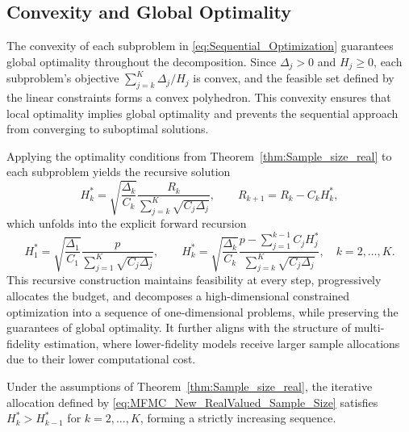 \subsection{Convexity and Global Optimality}
The convexity of each subproblem in \eqref{eq:Sequential_Optimization} guarantees global optimality throughout the decomposition. Since $\Delta_j > 0$ and $H_j \ge 0$, each subproblem's objective $\sum_{j=k}^K \Delta_j/H_j$ is convex, and the feasible set defined by the linear constraints forms a convex polyhedron. This convexity ensures that local optimality implies global optimality and prevents the sequential approach from converging to suboptimal solutions. 

Applying the optimality conditions from Theorem~\ref{thm:Sample_size_real} to each subproblem yields the recursive solution
%
\begin{equation*}
    H_k^* = \sqrt{\frac{\Delta_k}{C_k}} \frac{R_k}{\sum_{j=k}^K\sqrt{C_j\Delta_j}},
    \qquad 
    R_{k+1} = R_k - C_k H_k^*,
\end{equation*}
%
which unfolds into the explicit forward recursion
%
\begin{equation}\label{eq:MFMC_New_RealValued_Sample_Size}
    H_1^* = \sqrt{\frac{\Delta_1}{C_1}} \frac{p}{\sum_{j=1}^K\sqrt{C_j\Delta_j}}, 
    \qquad 
    H_k^* = \sqrt{\frac{\Delta_k}{C_k}} \frac{p-\sum_{j=1}^{k-1}C_jH_j^*}{\sum_{j=k}^K\sqrt{C_j\Delta_j}}, 
    \quad k = 2,\ldots, K.
\end{equation}
%
This recursive construction maintains feasibility at every step, progressively allocates the budget, and decomposes a high-dimensional constrained optimization into a sequence of one-dimensional problems, while preserving the guarantees of global optimality. It further aligns with the structure of multi-fidelity estimation, where lower-fidelity models receive larger sample allocations due to their lower computational cost.
%
\begin{theorem}
\label{thm:Monotonicity_H_k}
Under the assumptions of Theorem~\ref{thm:Sample_size_real}, the iterative allocation defined by \eqref{eq:MFMC_New_RealValued_Sample_Size} satisfies $H_k^* > H_{k-1}^*$ for $k=2,\ldots,K$, forming a strictly increasing sequence.
\end{theorem}
%

